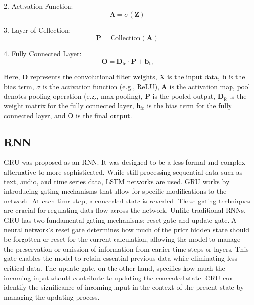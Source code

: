 2. Activation Function:
\begin{equation}
\mathbf{A} = \sigma(\mathbf{Z})
\end{equation}

3. Layer of Collection:
\begin{equation}
\mathbf{P} = \text{Collection}(\mathbf{A})
\end{equation}

4. Fully Connected Layer:
\begin{equation}
\mathbf{O} = \mathbf{D}_\text{fc} \cdot \mathbf{P} + \mathbf{b}_\text{fc}
\end{equation}

Here, $\mathbf{D}$ represents the convolutional filter weights, $\mathbf{X}$ is the input data, $\mathbf{b}$ is the bias term, $\sigma$ is the activation function (e.g., ReLU), $\mathbf{A}$ is the activation map, $\text{pool}$ denotes pooling operation (e.g., max pooling), $\mathbf{P}$ is the pooled output, $\mathbf{D}_\text{fc}$ is the weight matrix for the fully connected layer, $\mathbf{b}_\text{fc}$ is the bias term for the fully connected layer, and $\mathbf{O}$ is the final output.


\subsection{RNN}
GRU was proposed as an RNN. It was designed to be a less formal and complex alternative to more sophisticated. While still processing sequential data such as text, audio, and time series data, LSTM networks are used. GRU works by introducing gating mechanisms that allow for specific modifications to the network. At each time step, a concealed state is revealed. These gating techniques are crucial for regulating data flow across the network. Unlike traditional RNNs, GRU has two fundamental gating mechanisms: reset gate and update gate\cite{sun2016depth}. A neural network's reset gate determines how much of the prior hidden state should be forgotten or reset for the current calculation, allowing the model to manage the preservation or omission of information from earlier time steps or layers. This gate enables the model to retain essential previous data while eliminating less critical data. The update gate, on the other hand, specifies how much the incoming input should contribute to updating the concealed state. GRU can identify the significance of incoming input in the context of the present state by managing the updating process\cite{torres2021deep}.



